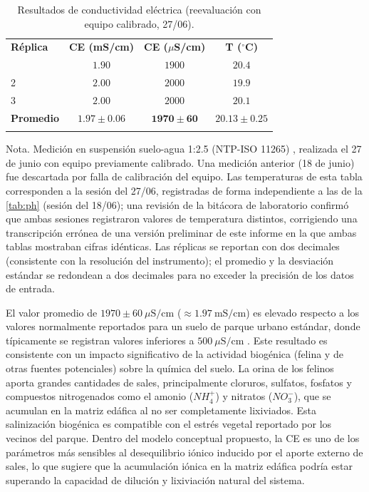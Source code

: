 \documentclass[fleqn]{jaes}
\begin{document}
\begin{table}[htbp]
\centering
\small
\caption{Resultados de conductividad eléctrica (reevaluación con equipo calibrado, 27/06).}\label{tab:ce}
\begin{tabular}{@{}lccc@{}}
\toprule
\textbf{Réplica} & \textbf{CE (mS/cm)} & \textbf{CE ($\mu$S/cm)} & \textbf{T ($^\circ$C)} \\
\colrule
1 & $1.90$ & $1900$ & $20.4$ \\
2 & $2.00$ & $2000$ & $19.9$ \\
3 & $2.00$ & $2000$ & $20.1$ \\
\colrule
\textbf{Promedio} & $\mathbf{1.97 \pm 0.06}$ & $\mathbf{1970 \pm 60}$ & $20.13 \pm 0.25$ \\
\botrule
\end{tabular}
\begin{tabnote}
Nota. Medición en suspensión suelo-agua 1:2.5 (NTP-ISO 11265) \cite{INACAL2018}, realizada el 27 de junio con equipo previamente calibrado. Una medición anterior (18 de junio) fue descartada por falla de calibración del equipo. Las temperaturas de esta tabla corresponden a la sesión del 27/06, registradas de forma independiente a las de la \cref{tab:ph} (sesión del 18/06); una revisión de la bitácora de laboratorio confirmó que ambas sesiones registraron valores de temperatura distintos, corrigiendo una transcripción errónea de una versión preliminar de este informe en la que ambas tablas mostraban cifras idénticas. Las réplicas se reportan con dos decimales (consistente con la resolución del instrumento); el promedio y la desviación estándar se redondean a dos decimales para no exceder la precisión de los datos de entrada.
\end{tabnote}
\end{table}

El valor promedio de $1970 \pm 60~\mu\text{S/cm}$ ($\approx 1.97~\text{mS/cm}$) es elevado respecto a los valores normalmente reportados para un suelo de parque urbano estándar, donde típicamente se registran valores inferiores a $500~\mu\text{S/cm}$ \cite{Allen2020}. Este resultado es consistente con un impacto significativo de la actividad biogénica (felina y de otras fuentes potenciales) sobre la química del suelo. La orina de los felinos aporta grandes cantidades de sales, principalmente cloruros, sulfatos, fosfatos y compuestos nitrogenados como el amonio ($NH_4^+$) y nitratos ($NO_3^-$), que se acumulan en la matriz edáfica al no ser completamente lixiviados. Esta salinización biogénica es compatible con el estrés vegetal reportado por los vecinos del parque. Dentro del modelo conceptual propuesto, la CE es uno de los parámetros más sensibles al desequilibrio iónico inducido por el aporte externo de sales, lo que sugiere que la acumulación iónica en la matriz edáfica podría estar superando la capacidad de dilución y lixiviación natural del sistema.
\end{document}
